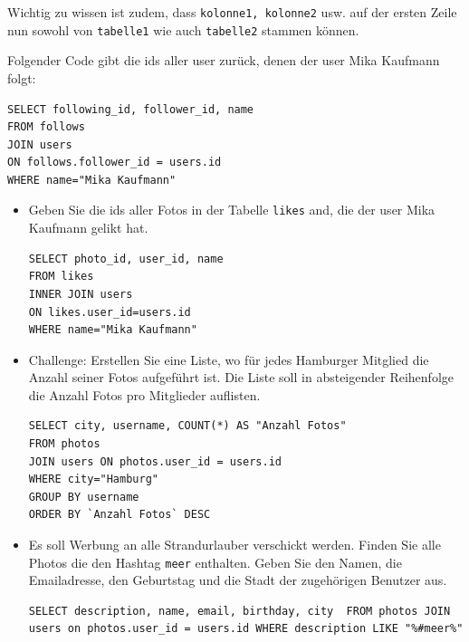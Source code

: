 Wichtig zu wissen ist zudem, dass \texttt{kolonne1, kolonne2} usw. auf der ersten Zeile nun sowohl von \texttt{tabelle1} wie auch \texttt{tabelle2} stammen können.

\begin{myexample}
Folgender Code gibt die ids aller user zurück, denen der user Mika Kaufmann folgt: 
\begin{lstlisting}[style=sql]
SELECT following_id, follower_id, name 
FROM follows 
JOIN users 
ON follows.follower_id = users.id 
WHERE name="Mika Kaufmann"
\end{lstlisting}

\end{myexample}

\begin{aufgabe}{}
\begin{itemize}
\item Geben Sie die ids aller Fotos in der Tabelle \texttt{likes} and, die der user Mika Kaufmann gelikt hat.
\begin{myantwort}
\begin{lstlisting}[style=sql]
SELECT photo_id, user_id, name 
FROM likes 
INNER JOIN users 
ON likes.user_id=users.id 
WHERE name="Mika Kaufmann"
\end{lstlisting}
\end{myantwort}
\item Challenge: Erstellen Sie eine Liste, wo für jedes Hamburger Mitglied die Anzahl seiner Fotos aufgeführt ist. Die Liste soll in absteigender Reihenfolge die Anzahl Fotos pro Mitglieder auflisten.
\begin{myantwort}
\begin{lstlisting}[style=sql]
SELECT city, username, COUNT(*) AS "Anzahl Fotos" 
FROM photos 
JOIN users ON photos.user_id = users.id 
WHERE city="Hamburg" 
GROUP BY username 
ORDER BY `Anzahl Fotos` DESC
\end{lstlisting}
\end{myantwort}
\item Es soll Werbung an alle Strandurlauber verschickt werden. Finden Sie alle Photos die den Hashtag \texttt{meer} enthalten. Geben Sie den Namen, die Emailadresse, den Geburtstag und die Stadt der zugehörigen Benutzer aus.
\begin{myantwort}
\begin{lstlisting}[style=sql]
SELECT description, name, email, birthday, city  FROM photos JOIN users on photos.user_id = users.id WHERE description LIKE "%#meer%"
\end{lstlisting}
\end{myantwort}
\end{itemize}
\end{aufgabe}

